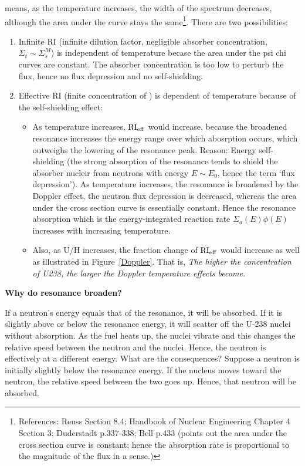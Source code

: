 \documentclass{school-22.211-notes}
\begin{document}
\clearpage
 means, as the temperature increases, the width of the spectrum decreases, although the area under the curve stays the same\footnote{References: Reuss Section 8.4; Handbook of Nuclear Engineering Chapter 4 Section 3; Duderstadt p.337-338; Bell p.433 (points out the area under the cross section curve is constant; hence the absorption rate is proportional to the magnitude of the flux in a sense.)}. 
There are two possibilities: 
\begin{enumerate}
\item Infinite RI (infinite dilution factor, negligible absorber concentration, $\Sigma_t \sim \Sigma_s^M$) is independent of temperature becase the area under the psi chi curves are constant. The absorber concentration is too low to perturb the flux, hence no flux depression and no self-shielding.  
\item Effective RI (finite concentration of ) is dependent of temperature because of the self-shielding effect: 
  \begin{itemize}
  \item As temperature increases, $\mathrm{RI}_{\mathrm{eff}}$ would increase, because the broadened resonance increases the energy range over which abosrption occurs, which outweighs the lowering of the resonance peak. Reason: Energy self-shielding (the strong absorption of the resonance tends to shield the absorber nucleir from neutrons with energy $E\sim E_0$, hence the term `flux depression').  As temperature increases, the resonance is broadened by the Doppler effect, the neutron flux depression is decreased, whereas the area under the cross section curve is essentially constant. Hence the resonance absorption which is the energy-integrated reaction rate $\Sigma_a(E) \phi(E)$ increases with increasing temperature. 
  \item Also, as U/H increases, the fraction change of $\mathrm{RI}_{\mathrm{eff}}$ would increase as well as illustrated in Figure~\ref{Doppler}. That is, \textit{The higher the concentration of U238, the larger the Doppler temperature effects become.}
  \end{itemize}
\end{enumerate}


\textbf{Why do resonance broaden?} 

If a neutron's energy equals that of the resonance, it will be absorbed. If it is
slightly above or below the resonance energy, it will scatter off the U-238 nuclei
without absorption. As the fuel heats up, the nuclei vibrate and this changes the
relative speed between the neutron and the nuclei. Hence, the neutron is
effectively at a different energy. What are the consequences? Suppose a neutron
is initially slightly below the resonance energy. If the nucleus moves toward the
neutron, the relative speed between the two goes up. Hence, that neutron will be
absorbed.
\end{document}
